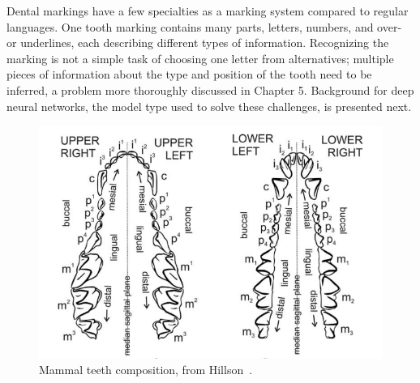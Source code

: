 \documentclass[english,twoside,openright]{UH_DS_MSc}
\begin{document}
Dental markings have a few specialties as a marking system compared to regular languages. One tooth marking contains many parts, letters, numbers, and over- or underlines, each describing different types of information. Recognizing the marking is not a simple task of choosing one letter from alternatives; multiple pieces of information about the type and position of the tooth need to be inferred, a problem more thoroughly discussed in Chapter 5. Background for deep neural networks, the model type used to solve these challenges, is presented next.

\begin{figure}[ht]
    \centering
    \includegraphics*[scale=0.43]{images/teeth_img_hillson_book.png}
    \caption{Mammal teeth composition, from Hillson~\cite{Hillson_2005}.}
    \label{image:mammal_teeth}
\end{figure}
\end{document}

